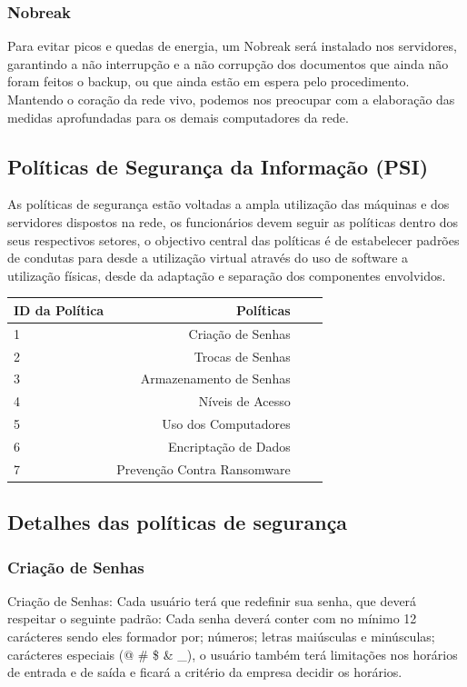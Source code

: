 \documentclass[12pt]{article}
\begin{document}
\subsubsection{Nobreak}
Para evitar picos e quedas de energia, um Nobreak será instalado nos servidores, garantindo a não interrupção e a não corrupção dos documentos que ainda não foram feitos o backup, ou que ainda estão em espera pelo procedimento. Mantendo o coração da rede vivo, podemos nos preocupar com a elaboração das medidas aprofundadas para os demais computadores da rede.

\subsection{Políticas de Segurança da Informação (PSI)}
As políticas de segurança estão voltadas a ampla utilização das máquinas e dos servidores dispostos na rede, os funcionários devem seguir as políticas dentro dos seus respectivos setores, o objectivo central das políticas é de estabelecer padrões de condutas para desde a utilização virtual através do uso de software a utilização físicas, desde da adaptação e separação dos componentes envolvidos.

\begin{center}
\begin{tabular}{| l | r | r | r |}
\hline 
ID da Política & Políticas\\
\hline
1 & Criação de Senhas\\
2 & Trocas de Senhas\\
3 & Armazenamento de Senhas\\
4 & Níveis de Acesso\\
5 & Uso dos Computadores\\
6 & Encriptação de Dados\\
7 & Prevenção Contra Ransomware\\
\hline
\end{tabular}
\end{center}

\subsection{Detalhes das políticas de segurança}

\subsubsection{Criação de Senhas}
Criação de Senhas: Cada usuário terá que redefinir sua senha, que deverá respeitar o seguinte padrão: Cada senha deverá conter com no mínimo 12 carácteres sendo eles formador por; números; letras maiúsculas e minúsculas; carácteres especiais (@ \# \$ \& \_), o usuário também terá limitações nos horários de entrada e de saída e ficará a critério da empresa decidir os horários.
\end{document}

